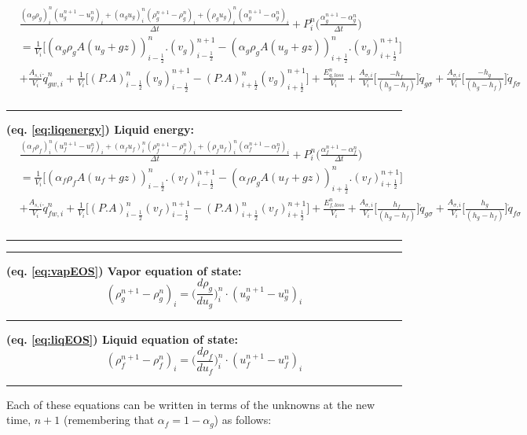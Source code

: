 \documentclass[11pt,letterpaper,titlepage]{article}
\newcommand{\half}{\frac{1}{2}}
\begin{document}
\begin{landscape}
\begin{equation*}
\begin{aligned}
&\frac{(\alpha_g\rho_g)_i^n (u_g^{n+1}-u_g^{n})_i+(\alpha_g u_g)_i^n   (\rho_g^{n+1} - \rho_g^n)_i+(\rho_g u_g)_i^n     (\alpha_g^{n+1}-\alpha_g^n)_i}{\Delta t} + P_i^n \biggr( \frac{\alpha_g^{n+1}-\alpha_g^n}{\Delta t} \biggr)\\
&=\frac{1}{V_i}\biggr[ (\alpha_g\rho_g A(u_g+gz))_{i-\half}^n.(v_g)_{i-\half}^{n+1} - (\alpha_g\rho_g A(u_g+gz))_{i+\half}^n.(v_g)_{i+\half}^{n+1} \biggr] \\
&+\frac{A_{s,i}}{V_i}\dot{q}_{gw,i}^n + \frac{1}{V_i}\biggr[   (P.A)_{i-\half}^n(v_g)_{i-\half}^{n+1} - (P.A)_{i+\half}^n(v_g)_{i+\half}^{n+1}   \biggr] + \frac{E_{g,loss}^n}{V_i}
+\frac{A_{\sigma,i}}{V_i} \biggr[\frac{- h_f  }{(h_g-h_f)}  \biggr]\dot{q}_{g\sigma}
+\frac{A_{\sigma,i}}{V_i} \biggr[\frac{ - h_g }{(h_g-h_f)}  \biggr]\dot{q}_{f\sigma}\\
\end{aligned}
\end{equation*}
\noindent\rule{9in}{0.4pt}
\textbf{(eq. \ref{eq:liqenergy}) Liquid energy:}
\begin{equation*}
\begin{aligned}
&\frac{(\alpha_f\rho_f)_i^n (u_f^{n+1}-u_f^{n})_i+(\alpha_f u_f)_i^n   (\rho_f^{n+1} - \rho_f^n)_i+(\rho_f u_f)_i^n     (\alpha_f^{n+1}-\alpha_f^n)_i}{\Delta t} + P_i^n \biggr( \frac{\alpha_f^{n+1}-\alpha_f^n}{\Delta t} \biggr)\\
&=\frac{1}{V_i}\biggr[ (\alpha_f\rho_f A(u_f+gz))_{i-\half}^n.(v_f)_{i-\half}^{n+1} - (\alpha_f\rho_g A(u_f+gz))_{i+\half}^n.(v_f)_{i+\half}^{n+1} \biggr] \\
&+\frac{A_{s,i}}{V_i}\dot{q}_{fw,i}^n + \frac{1}{V_i}\biggr[   (P.A)_{i-\half}^n(v_f)_{i-\half}^{n+1} - (P.A)_{i+\half}^n(v_f)_{i+\half}^{n+1}   \biggr] + \frac{E_{f,loss}^n}{V_i}
+\frac{A_{\sigma,i}}{V_i} \biggr[\frac{ h_f  }{(h_g-h_f)}  \biggr]\dot{q}_{g\sigma}
+\frac{A_{\sigma,i}}{V_i} \biggr[\frac{ h_g }{(h_g-h_f)}  \biggr]\dot{q}_{f\sigma}\\
\end{aligned}
\end{equation*}
\noindent\rule{9in}{0.4pt}
\newpage
\noindent\rule{9in}{0.4pt}
\textbf{(eq. \ref{eq:vapEOS}) Vapor equation of state:}
\begin{equation*} 
(\rho_{g}^{n+1} - \rho_{g}^{n})_i= \biggr( \frac{d\rho_g}{du_g} \biggr)_i^n \cdot (u_{g}^{n+1} - u_{g}^{n})_i
\end{equation*}
\noindent\rule{9in}{0.4pt}
\textbf{(eq. \ref{eq:liqEOS}) Liquid equation of state:}
\begin{equation*} 
(\rho_{f}^{n+1} - \rho_{f}^{n})_i= \biggr( \frac{d\rho_f}{du_f} \biggr)_i^n \cdot (u_{f}^{n+1} - u_{f}^{n})_i
\end{equation*}
\noindent\rule{9in}{0.4pt}
\newline
\newline
Each of these equations can be written in terms of the unknowns at the new time, $n+1$ (remembering that $\alpha_f=1-\alpha_g$) as follows:


\end{landscape}
\end{document}
